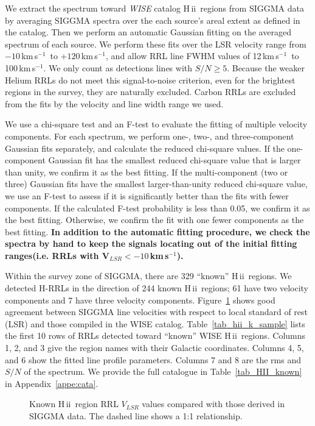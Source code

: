 \documentclass[manuscript]{aastex61}
\newcommand{\hii}{{\rm H\,}{{\sc ii}}}
\newcommand{\kms}{\,km\,s$^{-1}$}
\begin{document}
We extract the spectrum toward {\it WISE} catalog \hii\ regions from SIGGMA data by averaging SIGGMA spectra over the each source's areal extent as defined in the catalog.
Then we perform an automatic Gaussian fitting on the averaged spectrum of each source. 
We perform these fits over the LSR velocity range from $-10$\kms\ to $+120$\kms, and allow RRL line FWHM values of 12\kms\ to 100\kms. We only count as detections lines with $S/N \geq 5$.  Because the weaker Helium RRLs do not meet this signal-to-noise criterion, even for the brightest regions in the survey, they are naturally excluded.
Carbon RRLs are excluded from the fits by the velocity and line width range we used.

We use a chi-square test and an F-test to evaluate the fitting of multiple velocity components.
For each spectrum, we perform one-, two-, and three-component Gaussian fits separately, and calculate the reduced chi-square values.
If the one-component Gaussian fit has the smallest reduced chi-square value that is larger than unity, we confirm it as the best fitting.
If the multi-component (two or three) Gaussian fits have the smallest larger-than-unity reduced chi-square value, we use an F-test to assess if it is significantly better than the fits with fewer components.
If the calculated F-test probability is less than 0.05, we confirm it as the best fitting.
Otherwise, we confirm the fit with one fewer components as the best fitting.
\textbf{In addition to the automatic fitting procedure, we check the spectra by hand to keep the signals locating out of the initial fitting ranges(i.e. RRLs with V$_{LSR} < -10$\kms).}

Within the survey zone of SIGGMA, there are 329 ``known'' \hii\ regions.
We detected H-RRLs in the direction of 244 known \hii\ regions; 61 have two velocity components and 7 have three velocity components.
Figure~\ref{vlsr_map} shows good agreement between SIGGMA line velocities with respect to local standard of rest (LSR) and those compiled in the WISE catalog.
Table~\ref{tab_hii_k_sample} lists the first 10 rows of RRLs detected toward ``known'' WISE \hii\ regions.
Columns 1, 2, and 3 give the region names with their Galactic coordinates.
Columns 4, 5, and 6 show the fitted line profile parameters. 
Columns 7 and 8 are the rms and $S/N$ of the spectrum.
We provide the full catalogue in Table~\ref{tab_HII_known} in Appendix~\ref{appe:cata}.

\begin{figure}[htbp]
\caption{Known \hii\ region RRL $V_{LSR}$ values compared with
those derived in SIGGMA data.  The dashed line shows a 1:1 relationship.}\label{vlsr_map}
\end{figure}
\end{document}
